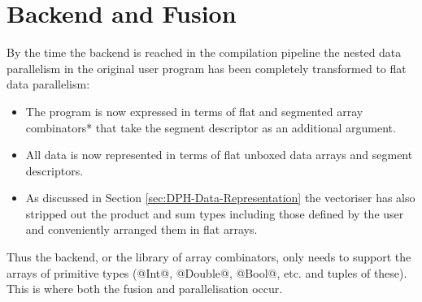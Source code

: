 \documentclass[preamble.tex]{subfiles}
\begin{document}
\section{Backend and Fusion}

By the time the backend is reached in the compilation pipeline the nested data parallelism in the original user program has been completely transformed to flat data parallelism:
\begin{itemize}
\item The program is now expressed in terms of flat and \*segmented array combinators*\isegmented{} that take the segment descriptor as an additional argument.
\item All data is now represented in terms of flat unboxed\iboxing{} data arrays and segment descriptors\isegd{}.
\item As discussed in Section \ref{sec:DPH-Data-Representation} the vectoriser has also stripped out the product and sum types including those defined by the user and conveniently arranged them in flat arrays.
\end{itemize}

Thus the backend, or the library of array combinators\icomb{}, only needs to support the arrays of primitive types (@Int@, @Double@, @Bool@, etc. and tuples of these). This is where both the fusion and parallelisation occur.


\end{document}
